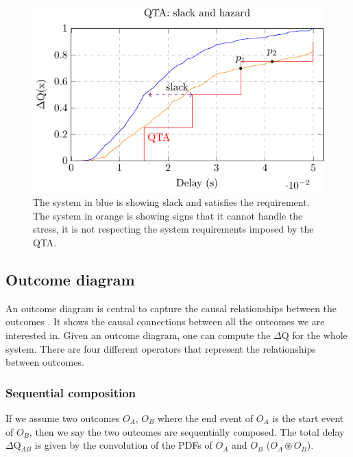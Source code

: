         \begin{figure}[H]
            \begin{center}
                \includegraphics[scale=1]{tikz/cdf_qta_slack.pdf}
            \end{center}
            \label{fig:qta_step}
            \caption{The system in blue is showing slack and satisfies the requirement. The system in orange is showing signs that it cannot handle the stress, it is not respecting the system requirements imposed by the QTA.}%
        \end{figure}

    \subsection{Outcome diagram}
        An outcome diagram is central to capture the causal relationships between the outcomes \cite{myo}. It shows the causal connections between all the outcomes we are interested in. Given an outcome diagram, one can compute the $\Delta$Q for the whole system. \cite{dq-tut}
        There are four different operators that represent the relationships between outcomes. 
    \subsubsection{Sequential composition}
        If we assume two outcomes $O_A$, $O_B$ where the end event of $O_A$ is the start event of $O_B$, then we say the two outcomes are sequentially composed. The total delay $\Delta$Q$_{AB}$ is given by the convolution of the PDFs of $O_A$ and $O_B$ ($O_A \circledast O_B$).
        
